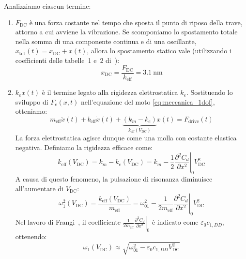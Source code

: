 \documentclass[11pt,a4paper]{article}
\begin{document}
\newpage

\noindent Analizziamo ciascun termine:

\begin{enumerate}
    \item $F_{\text{DC}}$ è una forza costante nel tempo che sposta il punto di riposo della trave, attorno a cui avviene la vibrazione. Se scomponiamo lo spostamento totale nella somma di una componente continua e di una oscillante, $x_{\text{tot}}(t) = x_{\text{DC}} + x(t)$, allora lo spostamento statico vale (utilizzando i coefficienti delle tabelle~1 e~2 di~\cite{frangi2023}):
    \begin{equation}
        x_{\text{DC}} = \frac{F_{\text{DC}}}{k_{\text{eff}}} = \SI{3.1}{\nano\meter}
    \end{equation}
    \item $k_e x(t)$ è il termine legato alla rigidezza elettrostatica $k_e$. Sostituendo lo sviluppo di $F_e(x, t)$ nell'equazione del moto \eqref{eq:meccanica_1dof}, otteniamo:
    \begin{equation}
        \label{eq:moto_keff}
        m_{\text{eff}} \ddot{x}(t) + b_{\text{eff}} \dot{x}(t) + \underbrace{\left( k_m - k_e \right)}_{k_{\text{eff}}(V_{\text{DC}})} x(t) = F_{\text{drive}}(t)
    \end{equation}
    La forza elettrostatica agisce dunque come una molla con costante elastica negativa. Definiamo la rigidezza efficace come:
    \begin{equation}
        k_{\text{eff}}(V_{\text{DC}}) = k_m - k_e(V_{\text{DC}}) = k_m - \frac{1}{2} \left. \frac{\partial^2 C_d}{\partial x^2} \right|_0 V_{\text{DC}}^2
    \end{equation}
    \noindent A causa di questo fenomeno, la pulsazione di risonanza diminuisce all'aumentare di $V_{\text{DC}}$:
    \begin{equation}
        \omega_1^2(V_{\text{DC}}) = \frac{k_{\text{eff}}(V_{\text{DC}})}{m_{\text{eff}}} = \omega_{01}^2 - \frac{1}{2 m_{\text{eff}}} \left. \frac{\partial^2 C_d}{\partial x^2} \right|_0 V_{\text{DC}}^2
    \end{equation}
    \vspace{0.3cm}
    \noindent Nel lavoro di Frangi~\cite{frangi2023}, il coefficiente $\frac{1}{2 m_{\text{eff}}} \left. \frac{\partial^2 C_d}{\partial x^2} \right|_0$ è indicato come $\varepsilon_0 c_{1,DD}$, ottenendo:
    \begin{equation}
        \label{eq:softening}
        \omega_1(V_{\text{DC}}) \approx \sqrt{\omega_{01}^2 - \varepsilon_0 c_{1,DD} V_{\text{DC}}^2}

\end{equation}
\end{enumerate}
\end{document}
